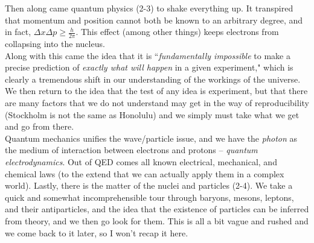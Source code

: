 \documentclass[10pt,letterpaper]{article}
\begin{document}
Then along came quantum physics (2-3) to shake everything up. It transpired that momentum and position cannot both be known to an arbitrary degree, and in fact, $\Delta x \Delta p \geq \frac{h}{2\pi}$. This effect (among other things) keeps electrons from collapsing into the nucleus. \\
\indent Along with this came the idea that it is ``\textit{fundamentally impossible} to make a precise prediction of \textit{exactly what will happen} in a given experiment," which is clearly a tremendous shift in our understanding of the workings of the universe. We then return to the idea that the test of any idea is experiment, but that there are many factors that we do not understand may get in the way of reproducibility (Stockholm is not the same as Honolulu) and we simply must take what we get and go from there. \\
\indent Quantum mechanics unifies the wave/particle issue, and we have the \textit{photon} as the medium of interaction between electrons and protons -- \textit{quantum electrodynamics}. Out of QED comes all known electrical, mechanical, and chemical laws (to the extend that we can actually apply them in a complex world). 
\indent Lastly, there is the matter of the nuclei and particles (2-4). We take a quick and somewhat incomprehensible tour through baryons, mesons, leptons, and their antiparticles, and the idea that the existence of particles can be inferred from theory, and we then go look for them. This is all a bit vague and rushed and we come back to it later, so I won't recap it here. 
\end{document}
